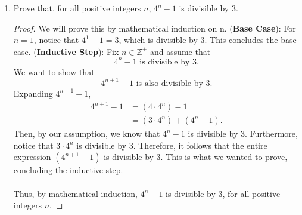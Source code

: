 \documentclass{article}
\begin{document}
\begin{enumerate}
    	\item Prove that, for all positive integers $n$, $4^n - 1$ is divisible by $3$.
                \begin{proof}
                    We will prove this by mathematical induction on n.
                    \ppar (\textbf{Base Case}): For $n = 1$, notice that $4^1 - 1 = 3$, which is divisible by $3$. This concludes the base case.
                    \ppar (\textbf{Inductive Step}): Fix $n\in\mathbb{Z}^+$ and assume that
                        \[
    			             4^n - 1\text{ is divisible by }3.
    		          \]
                    \ppar We want to show that
                        \[
    			             4^{n + 1} - 1\text{ is also divisible by }3.
    		          \]
                    \ppar Expanding $4^{n + 1} - 1$, 
                        \begin{align*}
                            4^{n + 1} - 1 &= (4 \cdot 4^n) - 1 \\ 
                            &= (3 \cdot 4^n) + (4^n - 1).
                        \end{align*}
                    \ppar Then, by our assumption, we know that $4^n - 1$ is divisible by $3$. Furthermore, notice that $3 \cdot 4^n$ is divisible by $3$. Therefore, it follows that the entire expression $(4^{n + 1} - 1)$ is divisible by $3$. This is what we wanted to prove, concluding the inductive step.
                    \\\\ Thus, by mathematical induction, $4^n - 1$ is divisible by $3$, for all positive integers $n$.
                \end{proof}


\end{enumerate}
\end{document}
